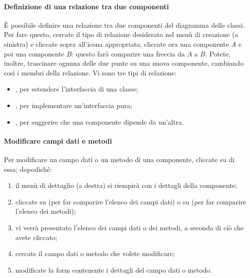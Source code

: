 \paragraph{Definizione di una relazione tra due componenti} È possibile definire una relazione tra due componenti del diagramma delle classi. Per fare questo, cercate il tipo di relazione desiderato nel menù di creazione (a sinistra) e cliccate sopra all'icona appropriata; cliccate ora una componente $A$ e poi una componente $B$: questo farà comparire una freccia da $A$ a $B$. Potete, inoltre, trascinare ognuna delle due punte su una nuova componente, cambiando così i membri della relazione. Vi sono tre tipi di relazione:
\begin{itemize}
	\item {}, per estendere l'interfaccia di una classe;
	\item {}, per implementare un'interfaccia pura;
	\item {}, per suggerire che una componente dipende da un'altra. %
\end{itemize}

\paragraph{Modificare campi dati e metodi} Per modificare un campo dati o un metodo di una componente, cliccate su di essa; dopodiché:
\begin{enumerate}
	\item il menù di dettaglio (a destra) si riempirà con i dettagli della componente;
	\item cliccate su  (per far comparire l'elenco dei campi dati) o su  (per far comparire l'elenco dei metodi);
	\item vi verrà presentato l'elenco dei campi dati o dei metodi, a seconda di ciò che avete cliccato;
	\item cercate il campo dati o metodo che volete modificare;
	\item modificate la form contenente i dettagli del campo dati o metodo.
\end{enumerate}


